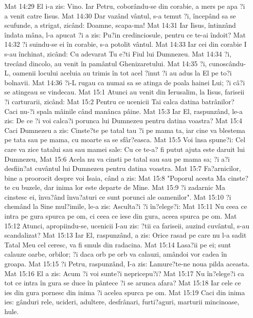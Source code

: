 Mat 14:29  El i-a zis: Vino. Iar Petru, coborându-se din corabie, a mers pe apa ?i a venit catre Iisus.
Mat 14:30  Dar vazând vântul, s-a temut ?i, începând sa se scufunde, a strigat, zicând: Doamne, scapa-ma!
Mat 14:31  Iar Iisus, întinzând îndata mâna, l-a apucat ?i a zis: Pu?in credinciosule, pentru ce te-ai îndoit?
Mat 14:32  ?i suindu-se ei în corabie, s-a potolit vântul.
Mat 14:33  Iar cei din corabie I s-au închinat, zicând: Cu adevarat Tu e?ti Fiul lui Dumnezeu.
Mat 14:34  ?i, trecând dincolo, au venit în pamântul Ghenizaretului.
Mat 14:35  ?i, cunoscându-L, oamenii locului aceluia au trimis în tot acel ?inut ?i au adus la El pe to?i bolnavii.
Mat 14:36  ?i-L rugau ca numai sa se atinga de poala hainei Lui; ?i câ?i se atingeau se vindecau.
Mat 15:1  Atunci au venit din Ierusalim, la Iisus, fariseii ?i carturarii, zicând:
Mat 15:2  Pentru ce ucenicii Tai calca datina batrânilor? Caci nu-?i spala mâinile când manânca pâine.
Mat 15:3  Iar El, raspunzând, le-a zis: De ce ?i voi calca?i porunca lui Dumnezeu pentru datina voastra?
Mat 15:4  Caci Dumnezeu a zis: Cinste?te pe tatal tau ?i pe mama ta, iar cine va blestema pe tata sau pe mama, cu moarte sa se sfâr?easca.
Mat 15:5  Voi însa spune?i: Cel care va zice tatalui sau sau mamei sale: Cu ce te-a? fi putut ajuta este daruit lui Dumnezeu,
Mat 15:6  Acela nu va cinsti pe tatal sau sau pe mama sa; ?i a?i desfiin?at cuvântul lui Dumnezeu pentru datina voastra.
Mat 15:7  Fa?arnicilor, bine a proorocit despre voi Isaia, când a zis:
Mat 15:8  "Poporul acesta Ma cinste?te cu buzele, dar inima lor este departe de Mine.
Mat 15:9  ?i zadarnic Ma cinstesc ei, înva?ând înva?aturi ce sunt porunci ale oamenilor".
Mat 15:10  ?i chemând la Sine mul?imile, le-a zis: Asculta?i ?i în?elege?i:
Mat 15:11  Nu ceea ce intra pe gura spurca pe om, ci ceea ce iese din gura, aceea spurca pe om.
Mat 15:12  Atunci, apropiindu-se, ucenicii I-au zis: ?tii ca fariseii, auzind cuvântul, s-au scandalizat?
Mat 15:13  Iar El, raspunzând, a zis: Orice rasad pe care nu l-a sadit Tatal Meu cel ceresc, va fi smuls din radacina.
Mat 15:14  Lasa?ii pe ei; sunt calauze oarbe, orbilor; ?i daca orb pe orb va calauzi, amândoi vor cadea în groapa.
Mat 15:15  ?i Petru, raspunzând, I-a zis: Lamure?te-ne noua pilda aceasta.
Mat 15:16  El a zis: Acum ?i voi sunte?i nepricepu?i?
Mat 15:17  Nu în?elege?i ca tot ce intra în gura se duce în pântece ?i se arunca afara?
Mat 15:18  Iar cele ce ies din gura pornesc din inima ?i acelea spurca pe om.
Mat 15:19  Caci din inima ies: gânduri rele, ucideri, adultere, desfrânari, furti?aguri, marturii mincinoase, hule.
